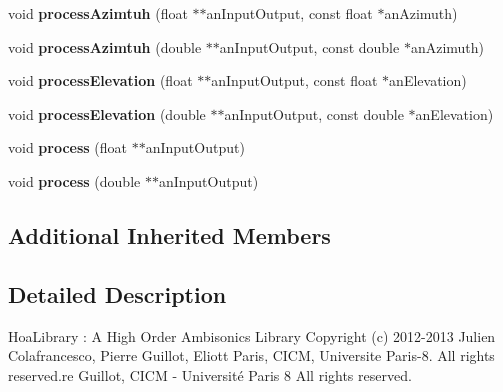 \begin{DoxyCompactItemize}
\item 
\hypertarget{class_ambisonic_encoder3_d_a1aec7814c2016ee40c9d0082e7036cea}{void {\bfseries process\-Azimtuh} (float $\ast$$\ast$an\-Input\-Output, const float $\ast$an\-Azimuth)}\label{class_ambisonic_encoder3_d_a1aec7814c2016ee40c9d0082e7036cea}

\item 
\hypertarget{class_ambisonic_encoder3_d_a9d6697c1f8f633ac786d330c29b61b9d}{void {\bfseries process\-Azimtuh} (double $\ast$$\ast$an\-Input\-Output, const double $\ast$an\-Azimuth)}\label{class_ambisonic_encoder3_d_a9d6697c1f8f633ac786d330c29b61b9d}

\item 
\hypertarget{class_ambisonic_encoder3_d_a0dfced873f1022b47254e437f011a1a4}{void {\bfseries process\-Elevation} (float $\ast$$\ast$an\-Input\-Output, const float $\ast$an\-Elevation)}\label{class_ambisonic_encoder3_d_a0dfced873f1022b47254e437f011a1a4}

\item 
\hypertarget{class_ambisonic_encoder3_d_a2b6da6267c00e39809f933610e6fcbb6}{void {\bfseries process\-Elevation} (double $\ast$$\ast$an\-Input\-Output, const double $\ast$an\-Elevation)}\label{class_ambisonic_encoder3_d_a2b6da6267c00e39809f933610e6fcbb6}

\item 
\hypertarget{class_ambisonic_encoder3_d_a696298cb581deb31e5b050337f94340b}{void {\bfseries process} (float $\ast$$\ast$an\-Input\-Output)}\label{class_ambisonic_encoder3_d_a696298cb581deb31e5b050337f94340b}

\item 
\hypertarget{class_ambisonic_encoder3_d_a521e85e678fa31f9ad5891bd6c43da9d}{void {\bfseries process} (double $\ast$$\ast$an\-Input\-Output)}\label{class_ambisonic_encoder3_d_a521e85e678fa31f9ad5891bd6c43da9d}

\end{DoxyCompactItemize}
\subsection*{Additional Inherited Members}


\subsection{Detailed Description}
Hoa\-Library \-: A High Order Ambisonics Library Copyright (c) 2012-\/2013 Julien Colafrancesco, Pierre Guillot, Eliott Paris, C\-I\-C\-M, Universite Paris-\/8. All rights reserved.\-re Guillot, C\-I\-C\-M -\/ Université Paris 8 All rights reserved.

